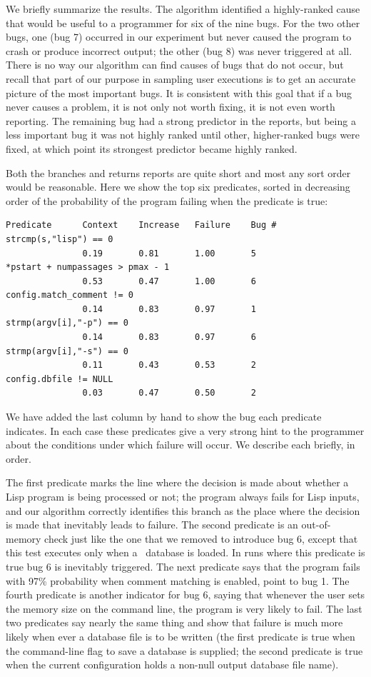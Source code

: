 We briefly summarize the results.
The algorithm identified a highly-ranked cause that would be useful to a programmer
for six of the nine bugs.  For the two other bugs,
one (bug 7) occurred in our experiment but never caused
the program to crash or produce incorrect output; the other (bug 8) was never
triggered at all.  There is no way our algorithm can find causes of bugs that do not
occur, but recall that part of our purpose in sampling user executions
is to get an accurate picture of the most important bugs. It is consistent with
this goal that if a bug never causes a problem, it is not only not worth fixing,
it is not even worth reporting.  The remaining bug had a strong predictor in the reports,
but being a less important bug it was not highly ranked until other, higher-ranked
bugs were fixed, at which point its strongest predictor became highly ranked.

Both the branches and returns reports are quite short and most any sort order would be
reasonable.  Here we show the top six predicates, sorted in decreasing order of the probability
of the program failing when the predicate is true:
\begin{verbatim}
Predicate      Context    Increase   Failure    Bug #
strcmp(s,"lisp") == 0  
               0.19       0.81       1.00       5
*pstart + numpassages > pmax - 1 
               0.53       0.47       1.00       6
config.match_comment != 0
               0.14       0.83       0.97       1
strmp(argv[i],"-p") == 0
               0.14       0.83       0.97       6
strmp(argv[i],"-s") == 0
               0.11       0.43       0.53       2
config.dbfile != NULL
               0.03       0.47       0.50       2
\end{verbatim}
We have added the last column by hand to show the bug each predicate indicates.  In
each case these predicates give a very strong hint to the programmer about the conditions
under which failure will occur.  We describe each briefly, in order.


The first predicate marks the line where the decision is made about
whether a Lisp program is being processed or not; the program always
fails for Lisp inputs, and our algorithm correctly identifies this
branch as the place where the decision is made that inevitably leads
to failure.  The second predicate is an out-of-memory check just like
the one that we removed to introduce bug 6, except that this test executes
only when a \moss\ database is loaded.  In runs where this predicate
is true bug 6 is inevitably triggered.  The next predicate says that
the program fails with 97\% probability when comment matching is
enabled, point to bug 1.  The fourth predicate is another indicator for
bug 6, saying that whenever the user sets the memory size on the command line,
the program is very likely to fail.  The last two predicates say nearly the
same thing and show that failure is much more likely when ever a
database file is to be written (the first predicate is true when the
command-line flag to save a database is supplied; the second predicate
is true when the current configuration holds a non-null output
database file name).


